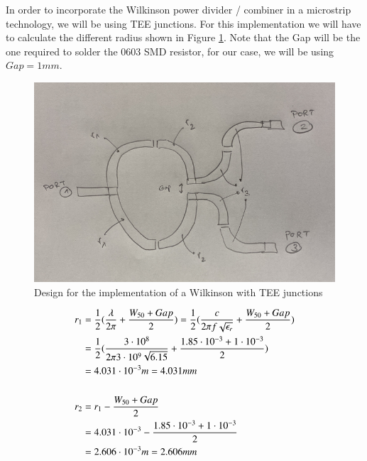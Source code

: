\documentclass[12pt]{report} %
\begin{document}
In order to incorporate the Wilkinson power divider / combiner in a microstrip technology, we will be using TEE junctions. For this implementation we will have to calculate the different radius shown in Figure \ref{fig:microstrip_elements:wilkinson_tee_design}. Note that the Gap will be the one required to solder the 0603 SMD resistor, for our case, we will be using $Gap = 1 mm$.

\begin{figure}
    \centering
    \includegraphics[width=1\linewidth]{images//microstrip_elements/wilkinson_tee_design.png}
    \caption{Design for the implementation of a Wilkinson with TEE junctions}
    \label{fig:microstrip_elements:wilkinson_tee_design}
\end{figure}

\begin{align*}
    r_1 &= \frac{1}{2} \* (\frac{\lambda}{2 \* \pi} + \frac{W_{50} + Gap}{2})  = \frac{1}{2} \* (\frac{c}{2 \* \pi \* f \* \sqrt{\epsilon_r}} + \frac{W_{50} + Gap}{2})  \\
    &= \frac{1}{2} \* (\frac{3 \cdot 10^8}{2 \* \pi \* 3 \cdot 10^9 \* \sqrt{6.15}} + \frac{1.85 \cdot 10^{-3} + 1 \cdot 10^{-3}}{2})  \\
    &= 4.031 \cdot 10^{-3} m = 4.031 mm \\
    \\
    r_2 &= r_1 - \frac{W_{50} + Gap}{2}  \\
    &= 4.031 \cdot 10^{-3} - \frac{1.85 \cdot 10^{-3} + 1 \cdot 10^{-3}}{2}  \\
    &= 2.606 \cdot 10^{-3} m = 2.606 mm \\
\end{align*}
\end{document}
